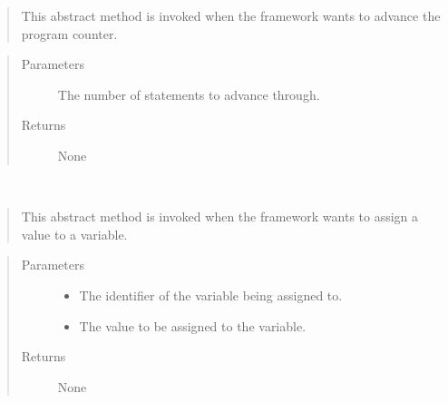 \documentclass[letterpaper,10pt,english]{sphinxmanual}
\begin{document}
\begin{fulllineitems}
\begin{fulllineitems}
\begin{quote}
\sphinxAtStartPar
This abstract method is invoked when the framework wants to advance the program counter.
\end{quote}
\begin{quote}\begin{description}
\item[{Parameters}] \leavevmode
\sphinxAtStartPar
{} \textendash{} The number of statements to advance through.

\item[{Returns}] \leavevmode
\sphinxAtStartPar
None

\end{description}\end{quote}

\end{fulllineitems}


\begin{fulllineitems}
\label{\detokenize{index:State.State.assign_variable}}~\begin{quote}

\sphinxAtStartPar
This abstract method is invoked when the framework wants to assign a value to a variable.
\end{quote}
\begin{quote}\begin{description}
\item[{Parameters}] \leavevmode\begin{itemize}
\item {} 
\sphinxAtStartPar
{} \textendash{} The identifier of the variable being assigned to.

\item {} 
\sphinxAtStartPar
{} \textendash{} The value to be assigned to the variable.

\end{itemize}

\item[{Returns}] \leavevmode
\sphinxAtStartPar
None

\end{description}\end{quote}


\end{fulllineitems}
\end{fulllineitems}
\end{document}
